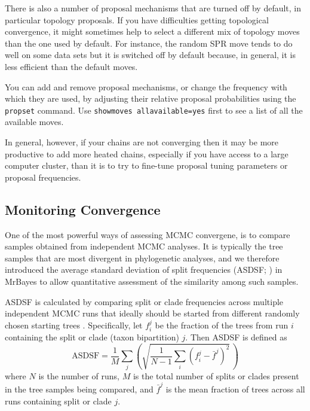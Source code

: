 \documentclass[12pt]{book}
\newcommand{\ttt}[1]{\texttt{#1}}
\begin{document}
There is also a number of proposal mechanisms that are turned off by default, in particular
topology proposals. If you have difficulties getting topological convergence, it might sometimes
help to select a different mix of topology moves than the one used by default. For instance, the
random SPR move tends to do well on some data sets but it is switched off by default because, in
general, it is less efficient than the default moves.

You can add and remove proposal mechanisms, or change the frequency with which they are used, by
adjusting their relative proposal probabilities using the \ttt{propset} command. Use \ttt{showmoves
allavailable=yes} first to see a list of all the available moves.

In general, however, if your chains are not converging then it may be more productive to add more
heated chains, especially if you have access to a large computer cluster, than it is to try to
fine-tune proposal tuning parameters or proposal frequencies.


\subsection{Monitoring Convergence}
\label{monitoringConvergence}

One of the most powerful ways of assessing MCMC convergene, is to compare samples obtained from
independent MCMC analyses. It is typically the tree samples that are most divergent in phylogenetic
analyses, and we therefore introduced the average standard deviation of split frequencies (ASDSF;
\citep{lakner08}) in MrBayes to allow quantitative assessment of the similarity among such samples.

ASDSF is calculated by comparing split or clade frequencies across multiple independent MCMC runs
that ideally should be started from different randomly chosen starting trees \citep{lakner08}.
Specifically, let $f_i^j$ be the fraction of the trees from run $i$ containing the split or clade (taxon
bipartition) $j$. Then ASDSF is defined as
\begin{equation*}
\text{ASDSF} = \frac{1}{M} \sum_j \left( \sqrt{ \frac{1}{N-1} \sum_i (f_i^j - \bar{f}^j)^2} \, \right)
\end{equation*}
where $N$ is the number of runs, $M$ is the total number of splits or clades present in the tree
samples being compared, and $\bar{f}^j$ is the mean fraction of trees across all runs containing
split or clade $j$.
\end{document}
